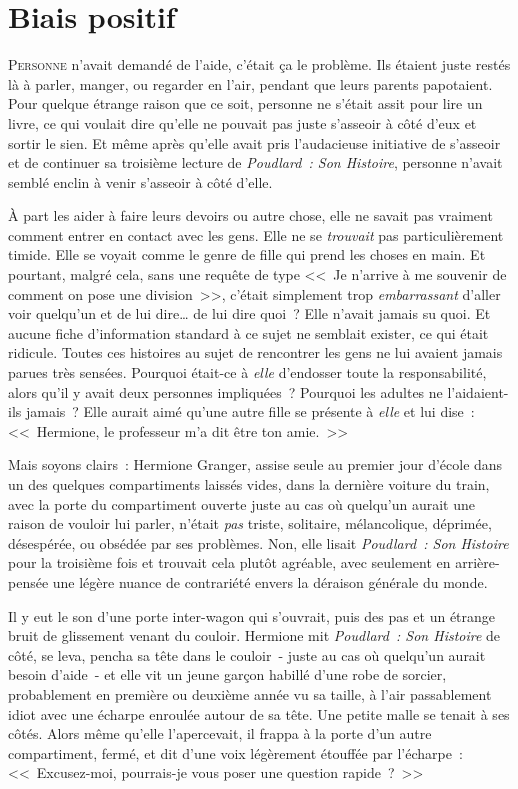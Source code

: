 \chapter{Biais positif}

\lettrine{P}{ersonne} n'avait demandé de l'aide, c'était ça le problème. Ils étaient juste restés là à parler, manger, ou regarder en l'air, pendant que leurs parents papotaient. Pour quelque étrange raison que ce soit, personne ne s'était assit pour lire un livre, ce qui voulait dire qu'elle ne pouvait pas juste s'asseoir à côté d'eux et sortir le sien. Et même après qu'elle avait pris l'audacieuse initiative de s'asseoir et de continuer sa troisième lecture de \emph{Poudlard~: Son Histoire}, personne n'avait semblé enclin à venir s'asseoir à côté d'elle.

À part les aider à faire leurs devoirs ou autre chose, elle ne savait pas vraiment comment entrer en contact avec les gens. Elle ne se \emph{trouvait} pas particulièrement timide. Elle se voyait comme le genre de fille qui prend les choses en main. Et pourtant, malgré cela, sans une requête de type <<~Je n'arrive à me souvenir de comment on pose une division~>>, c'était simplement trop \emph{embarrassant} d'aller voir quelqu'un et de lui dire… de lui dire quoi~? Elle n'avait jamais su quoi. Et aucune fiche d'information standard à ce sujet ne semblait exister, ce qui était ridicule. Toutes ces histoires au sujet de rencontrer les gens ne lui avaient jamais parues très sensées. Pourquoi était-ce à \emph{elle} d'endosser toute la responsabilité, alors qu'il y avait deux personnes impliquées~? Pourquoi les adultes ne l'aidaient-ils jamais~? Elle aurait aimé qu'une autre fille se présente à \emph{elle} et lui dise~: <<~Hermione, le professeur m'a dit être ton amie.~>>

Mais soyons clairs~: Hermione Granger, assise seule au premier jour d'école dans un des quelques compartiments laissés vides, dans la dernière voiture du train, avec la porte du compartiment ouverte juste au cas où quelqu'un aurait une raison de vouloir lui parler, n'était \emph{pas} triste, solitaire, mélancolique, déprimée, désespérée, ou obsédée par ses problèmes. Non, elle lisait \emph{Poudlard~: Son Histoire} pour la troisième fois et trouvait cela plutôt agréable, avec seulement en arrière-pensée une légère nuance de contrariété envers la déraison générale du monde.

Il y eut le son d'une porte inter-wagon qui s'ouvrait, puis des pas et un étrange bruit de glissement venant du couloir. Hermione mit \emph{Poudlard~: Son Histoire} de côté, se leva, pencha sa tête dans le couloir~- juste au cas où quelqu'un aurait besoin d'aide~- et elle vit un jeune garçon habillé d’une robe de sorcier, probablement en première ou deuxième année vu sa taille, à l'air passablement idiot avec une écharpe enroulée autour de sa tête. Une petite malle se tenait à ses côtés. Alors même qu'elle l'apercevait, il frappa à la porte d'un autre compartiment, fermé, et dit d'une voix légèrement étouffée par l'écharpe~: <<~Excusez-moi, pourrais-je vous poser une question rapide~?~>>


